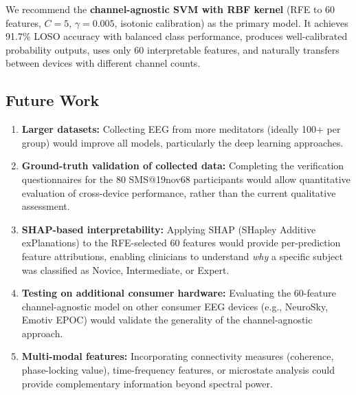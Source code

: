 \documentclass[12pt,a4paper]{article}
\begin{document}
We recommend the \textbf{channel-agnostic SVM with RBF kernel} (RFE to 60 features, $C=5$, $\gamma=0.005$, isotonic calibration) as the primary model. It achieves 91.7\% LOSO accuracy with balanced class performance, produces well-calibrated probability outputs, uses only 60 interpretable features, and naturally transfers between devices with different channel counts.

\subsection{Future Work}

\begin{enumerate}
  \item \textbf{Larger datasets:} Collecting EEG from more meditators (ideally 100+ per group) would improve all models, particularly the deep learning approaches.

  \item \textbf{Ground-truth validation of collected data:} Completing the verification questionnaires for the 80 SMS@19nov68 participants would allow quantitative evaluation of cross-device performance, rather than the current qualitative assessment.

  \item \textbf{SHAP-based interpretability:} Applying SHAP (SHapley Additive exPlanations) to the RFE-selected 60 features would provide per-prediction feature attributions, enabling clinicians to understand \textit{why} a specific subject was classified as Novice, Intermediate, or Expert.

  \item \textbf{Testing on additional consumer hardware:} Evaluating the 60-feature channel-agnostic model on other consumer EEG devices (e.g., NeuroSky, Emotiv EPOC) would validate the generality of the channel-agnostic approach.

  \item \textbf{Multi-modal features:} Incorporating connectivity measures (coherence, phase-locking value), time-frequency features, or microstate analysis could provide complementary information beyond spectral power.
\end{enumerate}
\end{document}
